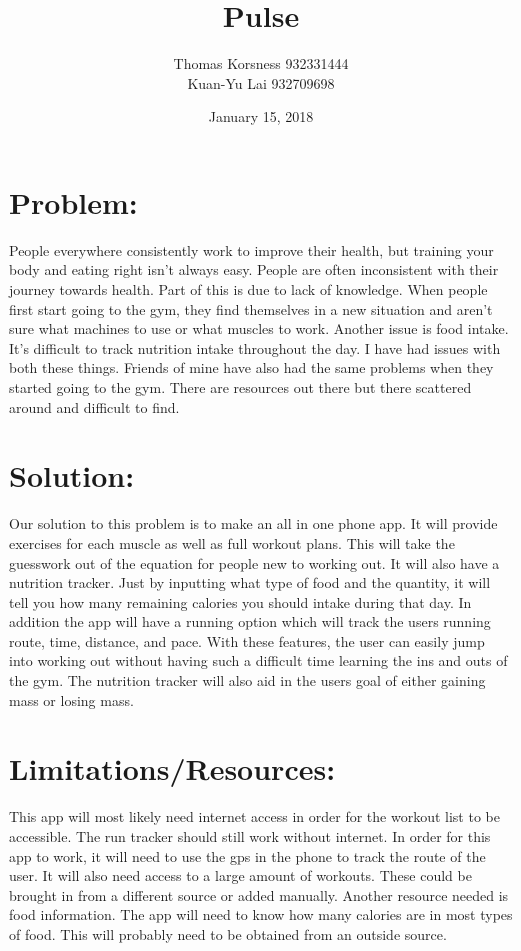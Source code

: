 \documentclass[12pt]{article}
\title{Pulse}
\author{Thomas Korsness 932331444 \\ Kuan-Yu Lai \hspace{1cm}932709698}
\date{January 15, 2018}
\begin{document}
\maketitle



\section*{Problem:}
People everywhere consistently work to improve their health, but training your body and eating right isn’t always easy. People are often inconsistent with their journey towards health. Part of this is due to lack of knowledge. When people first start going to the gym, they find themselves in a new situation and aren’t sure what machines to use or what muscles to work. Another issue is food intake. It’s difficult to track nutrition intake throughout the day. I have had issues with both these things. Friends of mine have also had the same problems when they started going to the gym. There are resources out there but there scattered around and difficult to find.

\section*{Solution:}
Our solution to this problem is to make an all in one phone app. It will provide exercises for each muscle as well as full workout plans. This will take the guesswork out of the equation for people new to working out. It will also have a nutrition tracker. Just by inputting what type of food and the quantity, it will tell you how many remaining calories you should intake during that day. In addition the app will have a running option which will track the users running route, time, distance, and pace. With these features, the user can easily jump into working out without having such a difficult time learning the ins and outs of the gym. The nutrition tracker will also aid in the users goal of either gaining mass or losing mass.


\section*{Limitations/Resources:}
This app will most likely need internet access in order for the workout list to be accessible. The run tracker should still work without internet. In order for this app to work, it will need to use the gps in the phone to track the route of the user. It will also need access to a large amount of workouts. These could be brought in from a different source or added manually. Another resource needed is food information. The app will need to know how many calories are in most types of food. This will probably need to be obtained from an outside source.
\end{document}
